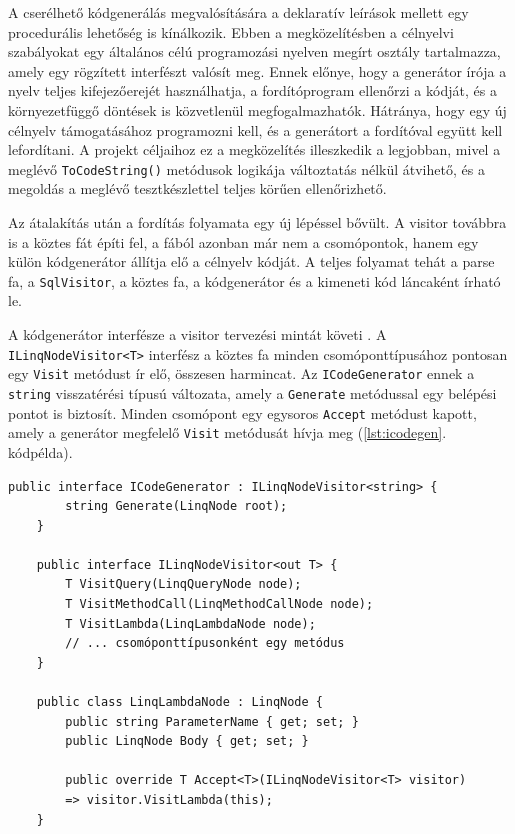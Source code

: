 A cserélhető kódgenerálás megvalósítására a deklaratív leírások mellett egy procedurális lehetőség is kínálkozik. Ebben a megközelítésben a célnyelvi szabályokat egy általános célú programozási nyelven megírt osztály tartalmazza, amely egy rögzített interfészt valósít meg. Ennek előnye, hogy a generátor írója a nyelv teljes kifejezőerejét használhatja, a fordítóprogram ellenőrzi a kódját, és a környezetfüggő döntések is közvetlenül megfogalmazhatók. Hátránya, hogy egy új célnyelv támogatásához programozni kell, és a generátort a fordítóval együtt kell lefordítani. A projekt céljaihoz ez a megközelítés illeszkedik a legjobban, mivel a meglévő \texttt{ToCodeString()} metódusok logikája változtatás nélkül átvihető, és a megoldás a meglévő tesztkészlettel teljes körűen ellenőrizhető.


Az átalakítás után a fordítás folyamata egy új lépéssel bővült. A visitor továbbra is a köztes fát építi fel, a fából azonban már nem a csomópontok, hanem egy külön kódgenerátor állítja elő a célnyelv kódját. A teljes folyamat tehát a parse fa, a \texttt{SqlVisitor}, a köztes fa, a kódgenerátor és a kimeneti kód láncaként írható le.

A kódgenerátor interfésze a visitor tervezési mintát követi \cite{gamma1994design}. A \\\texttt{ILinqNodeVisitor<T>} interfész a köztes fa minden csomóponttípusához pontosan egy \texttt{Visit} metódust ír elő, összesen harmincat. Az \texttt{ICodeGenerator} ennek a \texttt{string} visszatérési típusú változata, amely a \texttt{Generate} metódussal egy belépési pontot is biztosít. Minden csomópont egy egysoros \texttt{Accept} metódust kapott, amely a generátor megfelelő \texttt{Visit} metódusát hívja meg (\ref{lst:icodegen}. kódpélda).

\begin{lstlisting}[caption={A kódgenerátor interfésze és egy csomópont Accept metódusa}, label={lst:icodegen}]
	public interface ICodeGenerator : ILinqNodeVisitor<string> {
		string Generate(LinqNode root);
	}
	
	public interface ILinqNodeVisitor<out T> {
		T VisitQuery(LinqQueryNode node);
		T VisitMethodCall(LinqMethodCallNode node);
		T VisitLambda(LinqLambdaNode node);
		// ... csomóponttípusonként egy metódus
	}
	
	public class LinqLambdaNode : LinqNode {
		public string ParameterName { get; set; }
		public LinqNode Body { get; set; }
		
		public override T Accept<T>(ILinqNodeVisitor<T> visitor)
		=> visitor.VisitLambda(this);
	}
\end{lstlisting}

